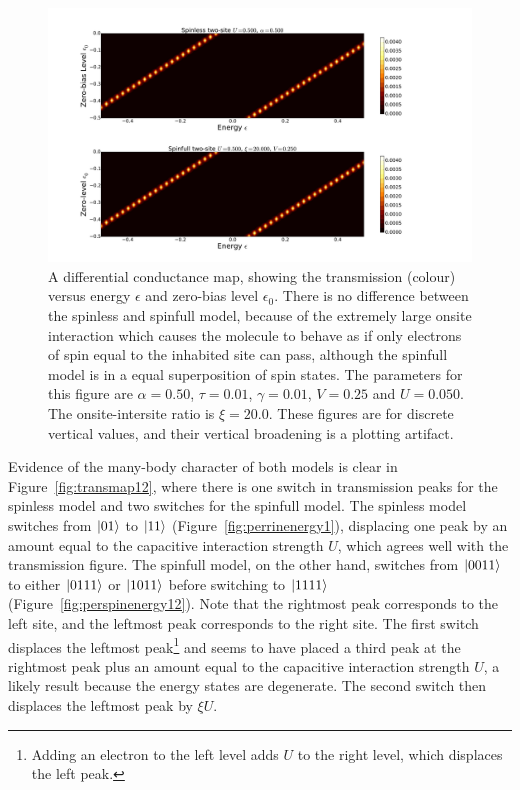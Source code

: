 \begin{figure}[tb]
    \centering
    \includegraphics[height=.38\textheight]{pdf/map/transmap_u3_k4.pdf}
    \caption{A differential conductance map, showing the transmission (colour) versus energy $\epsilon$ and zero-bias level $\epsilon_0$. There is no difference between the spinless and spinfull model, because of the extremely large onsite interaction which causes the molecule to behave as if only electrons of spin equal to the inhabited site can pass, although the spinfull model is in a equal superposition of spin states. The parameters for this figure are $\alpha=0.50$, $\tau=0.01$, $\gamma=0.01$, $V=0.25$ and $U=0.050$. The onsite-intersite ratio is $\xi=20.0$. These figures are for discrete vertical values, and their vertical broadening is a plotting artifact.}
    \label{fig:transmap34}
\end{figure}

Evidence of the many-body character of both models is clear in Figure~\ref{fig:transmap12}, where there is one switch in transmission peaks for the spinless model and two switches for the spinfull model. The spinless model switches from $\ket{01}$ to $\ket{11}$ (Figure~\ref{fig:perrinenergy1}), displacing one peak by an amount equal to the capacitive interaction strength $U$, which agrees well with the transmission figure.  The spinfull model, on the other hand, switches from $\ket{0011}$ to either $\ket{0111}$ or $\ket{1011}$ before switching to $\ket{1111}$ (Figure~\ref{fig:perspinenergy12}). Note that the rightmost peak corresponds to the left site, and the leftmost peak corresponds to the right site. The first switch displaces the leftmost peak\footnote{Adding an electron to the left level adds $U$ to the right level, which displaces the left peak.} and seems to have placed a third peak at the rightmost peak plus  an amount equal to the capacitive interaction strength $U$, a likely result because the energy states are degenerate. The second switch then displaces the leftmost peak by $\xi U$. 
 
